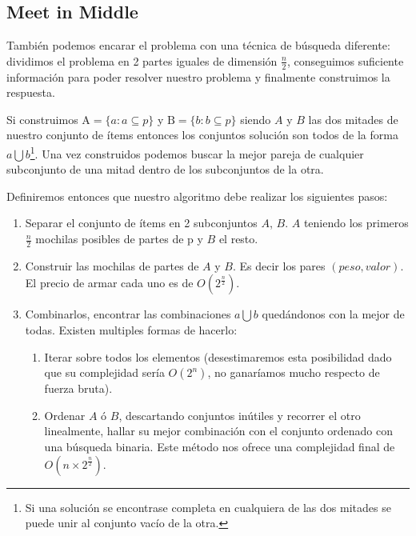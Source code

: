 \documentclass[fleqn, 11pt]{article}
\begin{document}
\subsection{Meet in Middle}

También podemos encarar el problema con una técnica de búsqueda diferente:
dividimos el problema en 2 partes iguales de dimensión $\frac{n}{2}$,
conseguimos suficiente información para poder resolver nuestro problema y
finalmente construimos la respuesta.

Si construimos $\text{A} = \{a : a \subseteq p\}$ y $\text{B} = \{b : b
\subseteq p\}$ siendo $A$ y $B$ las dos mitades de nuestro conjunto de ítems
entonces los conjuntos solución son todos de la forma $a \bigcup b$\footnote{Si
una solución se encontrase completa en cualquiera de las dos mitades se puede
unir al conjunto vacío de la otra.}. Una vez construidos podemos buscar la
mejor pareja de cualquier subconjunto de una mitad dentro de los subconjuntos
de la otra.

Definiremos entonces que nuestro algoritmo debe realizar los siguientes pasos:

\begin{enumerate}
\item Separar el conjunto de ítems en 2 subconjuntos $A$, $B$. $A$ teniendo los
primeros $\frac{n}{2}$ mochilas posibles de partes de p y $B$ el resto.

\item Construir las mochilas de partes de $A$ y $B$. Es decir los pares $(peso, valor)$. El precio de armar cada uno es de $O(2^{\frac{n}{2}})$.

\item Combinarlos, encontrar las combinaciones $a \bigcup b$ quedándonos con la
mejor de todas. Existen multiples formas de hacerlo:

\begin{enumerate}
	\item Iterar sobre todos los elementos (desestimaremos esta posibilidad
	dado que su complejidad sería $O(2^n)$, no ganaríamos mucho respecto de
	fuerza bruta).

	\item Ordenar $A$ ó $B$, descartando conjuntos inútiles y recorrer el
	otro linealmente, hallar su mejor combinación con el conjunto ordenado
	con una búsqueda binaria. Este método nos ofrece una complejidad final
	de $O(n \times 2^{\frac{n}{2}})$.
\end{enumerate}
\end{enumerate}
\end{document}
